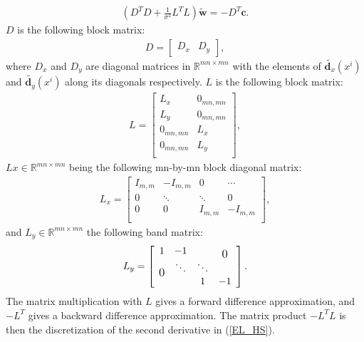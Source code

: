 \documentclass[10pt,a4paper]{article}
\newcommand\bigzero{\makebox(0,0){\text{\large 0}}}
\begin{document}
\begin{align}
(D^T D + \frac{1}{\sigma^2} L^TL) \tilde{\textbf{w}} = - D^T \textbf{c}.
\end{align}
$D$ is the following block matrix:
\begin{align*}
D = \left[
\begin{array}{c|c}
D_x & D_y
\end{array}
\right],
\end{align*}
where $D_x$ and $D_y$ are diagonal matrices in $\mathbb{R}^{mn \times mn}$ with the elements of $\tilde{\textbf{d}_x}(x^i)$ and $\tilde{\textbf{d}_y}(x^i)$ along its diagonals respectively. $L$ is the following block matrix:
\begin{align*}
L = \left[
\begin{array}{c|c}
L_x & 0_{mn,mn} \\
L_y & 0_{mn,mn} \\
0_{mn,mn} & L_x \\
0_{mn,mn} & L_y \\
\end{array}
\right],
\end{align*}
$Lx \in \mathbb{R}^{mn \times mn}$ being the following mn-by-mn block diagonal matrix:
\begin{align*}
L_x = \left[
\begin{array}{c|c|c|c}
I_{m,m} & -I_{m,m} & 0 & \cdots \\ \hline
0 & \ddots & \ddots & 0 \\ \hline
0 & 0 & I_{m,m} & -I_{m,m} \\
\end{array}
\right],
\end{align*}
and $L_y \in \mathbb{R}^{mn \times mn}$ the following band matrix:
\begin{align*}
L_y = \left[
\begin{array}{c c c c}
1 & -1 &  & \bigzero \\ 
 \bigzero & \ddots & \ddots &  \\
 &  & 1 & -1 \\
\end{array}
\right].
\end{align*}
The matrix multiplication with $L$ gives a forward difference approximation, and $-L^T$ gives a backward difference approximation. The matrix product $-L^TL$ is then the discretization of the second derivative in (\ref{EL_HS}).
\end{document}
